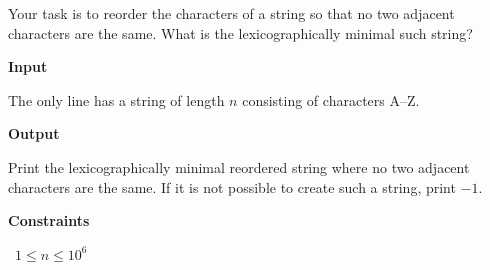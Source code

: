 Your task is to reorder the characters of a string so that no two adjacent characters are the same. What is the lexicographically minimal such string?

\vspace{0.3cm}\noindent\textbf{Input}

The only line has a string of length $n$ consisting of characters A–Z.

\vspace{0.3cm}\noindent\textbf{Output}

Print the lexicographically minimal reordered string where no two adjacent characters are the same. If it is not possible to create such a string, print $-1$.

\vspace{0.3cm}\noindent\textbf{Constraints}

\textbullet\ $1 \le n \le 10^6$